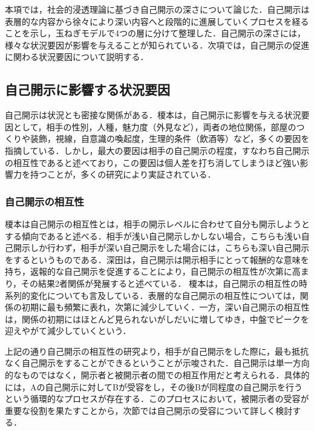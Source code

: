 本項では，社会的浸透理論に基づき自己開示の深さについて論じた．自己開示は表層的な内容から徐々により深い内容へと段階的に進展していくプロセスを経ることを示し，玉ねぎモデルで4つの層に分けて整理した．自己開示の深さには，様々な状況要因が影響を与えることが知られている．次項では，自己開示の促進に関わる状況要因について説明する．



\subsection{自己開示に影響する状況要因}\label{状況要因}

自己開示は状況とも密接な関係がある．榎本は，自己開示に影響を与える状況要因として，相手の性別，人種，魅力度（外見など），両者の地位関係，部屋のつくりや装飾，視線，自意識の喚起度，生理的条件（飲酒等）など，多くの要因を指摘している．しかし，最大の要因は相手の自己開示の程度，すなわち自己開示の相互性であると述べており，この要因は個人差を打ち消してしまうほど強い影響力を持つことが，多くの研究により実証されている．


\subsubsection{自己開示の相互性}\label{自己開示の相互性}

榎本は自己開示の相互性とは，相手の開示レベルに合わせて自分も開示しようとする傾向であると述べる．相手が浅い自己開示しかしない場合，こちらも浅い自己開示しか行わず，相手が深い自己開示をした場合には，こちらも深い自己開示をするというものである．深田\cite{深田_2000}は，自己開示は開示相手にとって報酬的な意味を持ち，返報的な自己開示を促進することにより，自己開示の相互性が次第に高まり，その結果2者関係が発展すると述べている．
榎本は，自己開示の相互性の時系列的変化についても言及している．表層的な自己開示の相互性については，関係の初期に最も頻繁に表れ，次第に減少していく．一方，深い自己開示の相互性は，関係の初期にはほとんど見られないがしだいに増してゆき，中盤でピークを迎えやがて減少していくという．


上記の通り自己開示の相互性の研究より，相手が自己開示をした際に，最も抵抗なく自己開示をすることができるということが示唆された．自己開示は単一方向的なものではなく，開示者と被開示者の間での相互作用だと考えられる．具体的には，Aの自己開示に対してBが受容をし，その後Bが同程度の自己開示を行うという循環的なプロセスが存在する．このプロセスにおいて，被開示者の受容が重要な役割を果たすことから，次節では自己開示の受容について詳しく検討する．